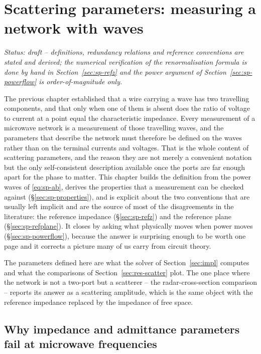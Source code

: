 \section{Scattering parameters: measuring a network with waves}
\label{sec:sparams}

\noindent\emph{Status: draft -- definitions, redundancy relations and reference conventions are stated and derived;
the numerical verification of the renormalisation formula is done by hand in Section~\ref{sec:sp-refz} and the
power argument of Section~\ref{sec:sp-powerflow} is order-of-magnitude only.}

The previous chapter established that a wire carrying a wave has two travelling components, and that only when
one of them is absent does the ratio of voltage to current at a point equal the characteristic impedance. Every
measurement of a microwave network is a measurement of those travelling waves, and the parameters that describe
the network must therefore be defined on the waves rather than on the terminal currents and voltages. That is
the whole content of scattering parameters, and the reason they are not merely a convenient notation but the
only self-consistent description available once the ports are far enough apart for the phase to matter. This
chapter builds the definition from the power waves of \eqref{eq:sp-ab}, derives the properties that a
measurement can be checked against (\S\ref{sec:sp-properties}), and is explicit about the two conventions that
are usually left implicit and are the source of most of the disagreements in the literature: the reference
impedance (\S\ref{sec:sp-refz}) and the reference plane (\S\ref{sec:sp-refplane}). It closes by asking what
physically moves when power moves (\S\ref{sec:sp-powerflow}), because the answer is surprising enough to be worth
one page and it corrects a picture many of us carry from circuit theory.

The parameters defined here are what the solver of Section~\ref{sec:impl} computes and what the comparisons of
Section~\ref{sec:res-scatter} plot. The one place where the network is not a two-port but a scatterer -- the
radar-cross-section comparison -- reports its answer as a scattering amplitude, which is the same object with
the reference impedance replaced by the impedance of free space.

\subsection{Why impedance and admittance parameters fail at microwave frequencies}
\label{sec:sp-zy}


